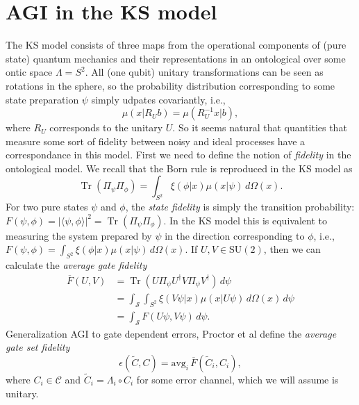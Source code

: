 \documentclass[a4paper]{article}
\DeclareMathOperator{\Tr}{Tr}
\begin{document}
    \section{AGI in the KS model}

    The KS model consists of three maps from the operational
    components of (pure state) quantum mechanics and their
    representations in an ontological over some ontic space
    $\Lambda = S^2$. All (one qubit) unitary transformations
    can be seen as rotations in the sphere, so the
    probability distribution corresponding to some state
    preparation $\psi$ simply udpates covariantly, i.e.,
    \begin{equation}
        \mu(x | R_U b)
        = \mu(R_U^{-1} x | b),
    \end{equation}
    where $R_U$ corresponds to the unitary $U$. So it seems
    natural that quantities that measure some sort of
    fidelity between noisy and ideal processes have a
    correspondance in this model. First we need to define
    the notion of \textit{fidelity} in the ontological
    model. We recall that the Born rule is reproduced in the
    KS model as
    \begin{equation}
        \Tr(\Pi_\psi \Pi_\phi)
        = \int_{S^2} \xi(\phi|x) \mu(x|\psi) \, d\Omega(x).
    \end{equation}
    For two pure states $\psi$ and $\phi$, the \textit{state
    fidelity} is simply the transition probability:
    $F(\psi,\phi) = |\langle \psi, \phi \rangle|^2 =
    \Tr(\Pi_\psi \Pi_\phi)$. In the KS model this is
    equivalent to measuring the system prepared by $\psi$ in
    the direction corresponding to $\phi$, i.e.,
    $F(\psi,\phi) = \int_{S^2} \xi(\phi|x) \mu(x|\psi) \,
    d\Omega(x)$. If $U,V \in \text{SU}(2)$, then we can
    calculate the \textit{average gate fidelity}
    \begin{align}
        \overline{F}(U,V)
        &= \Tr\left( U \Pi_\psi U^{\dag} V \Pi_\psi V^{\dag}
        \right) \, d\psi \\
        &= \int_{\mathcal{S}} \int_{S^2} \xi(V\psi | x) \mu(x
        | U\psi) \, d\Omega(x) \, d\psi \\
        &= \int_{\mathcal{S}} F(U\psi,V\psi) \, d\psi.
    \end{align}
    Generalization AGI to gate dependent errors, Proctor et
    al define the \textit{average gate set fidelity}
    \begin{equation}
        \epsilon(\tilde C, C)
        = \text{avg}_i \, \overline{F}(\tilde C_i, C_i),
    \end{equation}
    where $C_i \in \mathcal{C}$ and $\tilde C_i = \Lambda_i
    \circ C_i$ for some error channel, which we will assume
    is unitary.


    
\end{document}
